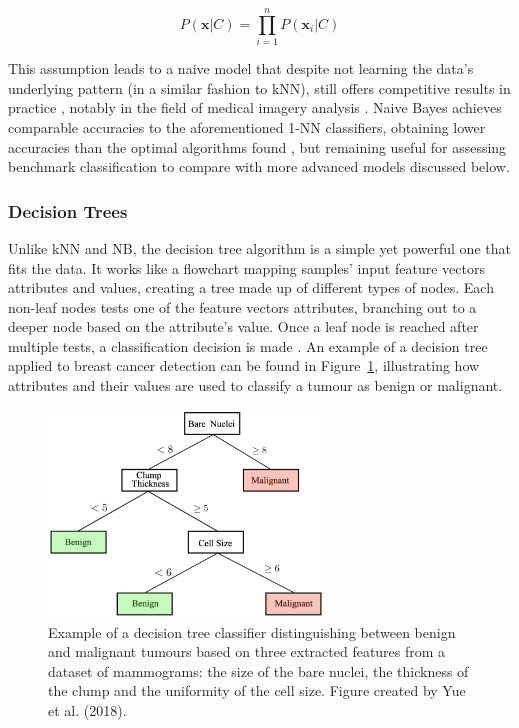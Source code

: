\begin{equation}
\label{eq:naive-bayes}
    P(\textbf{x}|C)=\prod_{i=1}^{n}P(\textbf{x}_i|C)
\end{equation}

This assumption leads to a naive model that despite not learning the data's underlying pattern (in a similar fashion to kNN), still offers competitive results in practice \citep{russell2002artificial}, notably in the field of medical imagery analysis \citep{rish2001empirical}. Naive Bayes achieves comparable accuracies to the aforementioned 1-NN classifiers, obtaining lower accuracies than the optimal algorithms found \citep{Yue2018} \citep{Montazeri2016}, but remaining useful for assessing benchmark classification to compare with more advanced models discussed below.

\subsubsection{Decision Trees}

Unlike kNN and NB, the decision tree algorithm is a simple yet powerful one that fits the data. It works like a flowchart mapping samples' input feature vectors attributes and values, creating a tree made up of different types of nodes. Each non-leaf nodes tests one of the feature vectors attributes, branching out to a deeper node based on the attribute's value. Once a leaf node is reached after multiple tests, a classification decision is made \citep{quinlan2014c4}. An example of a decision tree applied to breast cancer detection can be found in Figure~\ref{fig:litsurvey-dt-example}, illustrating how attributes and their values are used to classify a tumour as benign or malignant.

\begin{figure}[ht]
\centerline{\includegraphics[width=0.65\textwidth]{Dissertation/figures/litsurvey/dt.png}}
\caption{\label{fig:litsurvey-dt-example}Example of a decision tree classifier distinguishing between benign and malignant tumours based on three extracted features from a dataset of mammograms: the size of the bare nuclei, the thickness of the clump and the uniformity of the cell size. Figure created by Yue et al. (2018).}
\end{figure}

